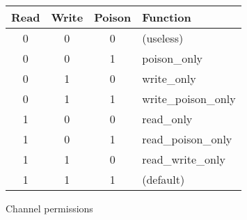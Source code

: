 \documentclass[11pt,oneside,a4paper]{article}
\begin{document}
\begin{figure}[h]
\centering
\begin{tabular}{c|c|c|l}
Read & Write & Poison & Function \\
\hline
0 & 0 & 0 & (useless) \\
0 & 0 & 1 & poison\_only \\
0 & 1 & 0 & write\_only \\
0 & 1 & 1 & write\_poison\_only \\
1 & 0 & 0 & read\_only \\
1 & 0 & 1 & read\_poison\_only \\
1 & 1 & 0 & read\_write\_only \\
1 & 1 & 1 & (default) \\
\end{tabular}
\caption{Channel permissions}
\label{channel-permissions}
\end{figure}
\end{document}
